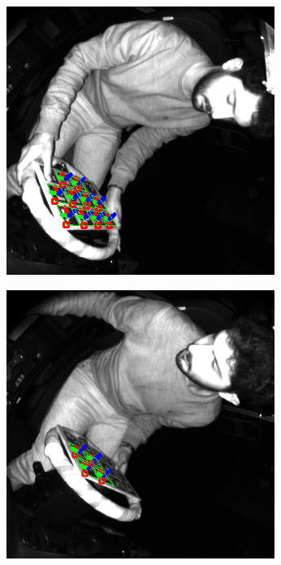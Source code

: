 \begin{figure}[htpb]
\begin{subfigure}[t]{0.23\textwidth}
        \includegraphics[width=\textwidth]{media/chapter 5/aruco_board_estimation1.png}
    \end{subfigure}\hfill
    \begin{subfigure}[t]{0.23\textwidth}
        \centering
        \includegraphics[width=\textwidth]{media/chapter 5/aruco_board_estimation2.png}

\end{subfigure}
\end{figure}
